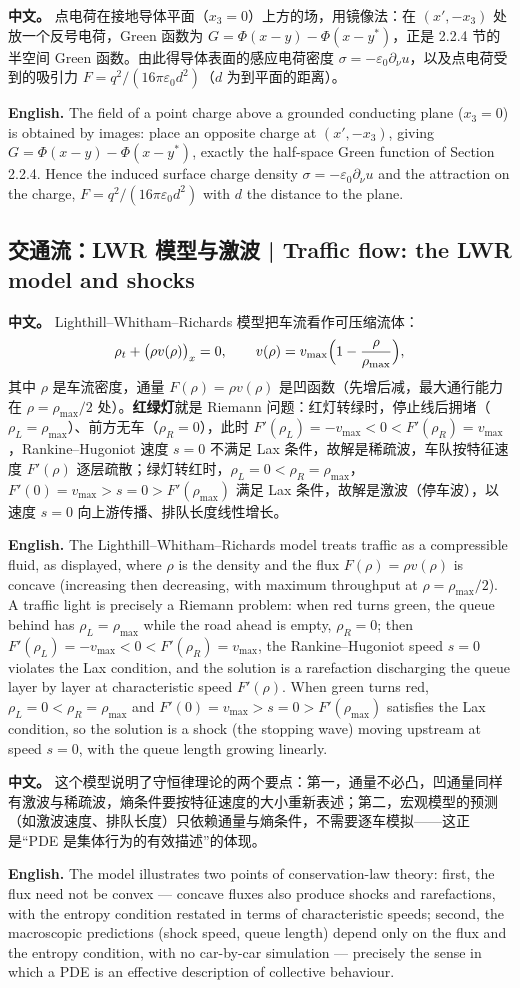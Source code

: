 \documentclass[UTF8,11pt,a4paper]{ctexart}
\newcommand{\APS}[2]{\par\noindent\textbf{中文。} #1\par\noindent\textbf{English.} #2\par\smallskip}
\begin{document}
\APS{点电荷在接地导体平面（$x_3=0$）上方的场，用镜像法：在 $(x',-x_3)$ 处放一个反号电荷，Green 函数为 $G=\Phi(x-y)-\Phi(x-y^*)$，正是 2.2.4 节的半空间 Green 函数。由此得导体表面的感应电荷密度 $\sigma=-\varepsilon_0\partial_\nu u$，以及点电荷受到的吸引力 $F=q^2/(16\pi\varepsilon_0d^2)$（$d$ 为到平面的距离）。}{The field of a point charge above a grounded conducting plane ($x_3=0$) is obtained by images: place an opposite charge at $(x',-x_3)$, giving $G=\Phi(x-y)-\Phi(x-y^*)$, exactly the half-space Green function of Section 2.2.4. Hence the induced surface charge density $\sigma=-\varepsilon_0\partial_\nu u$ and the attraction on the charge, $F=q^2/(16\pi\varepsilon_0d^2)$ with $d$ the distance to the plane.}

\subsection{交通流：LWR 模型与激波 | Traffic flow: the LWR model and shocks}
\APS{Lighthill--Whitham--Richards 模型把车流看作可压缩流体：
\[
\rho_t+\bigl(\rho v(\rho)\bigr)_x=0,\qquad v(\rho)=v_{\max}\Bigl(1-\frac{\rho}{\rho_{\max}}\Bigr),
\]
其中 $\rho$ 是车流密度，通量 $F(\rho)=\rho v(\rho)$ 是凹函数（先增后减，最大通行能力在 $\rho=\rho_{\max}/2$ 处）。\textbf{红绿灯}就是 Riemann 问题：红灯转绿时，停止线后拥堵（$\rho_L=\rho_{\max}$）、前方无车（$\rho_R=0$），此时 $F'(\rho_L)=-v_{\max}<0<F'(\rho_R)=v_{\max}$，Rankine--Hugoniot 速度 $s=0$ 不满足 Lax 条件，故解是稀疏波，车队按特征速度 $F'(\rho)$ 逐层疏散；绿灯转红时，$\rho_L=0<\rho_R=\rho_{\max}$，$F'(0)=v_{\max}>s=0>F'(\rho_{\max})$ 满足 Lax 条件，故解是激波（停车波），以速度 $s=0$ 向上游传播、排队长度线性增长。}{The Lighthill--Whitham--Richards model treats traffic as a compressible fluid, as displayed, where $\rho$ is the density and the flux $F(\rho)=\rho v(\rho)$ is concave (increasing then decreasing, with maximum throughput at $\rho=\rho_{\max}/2$). A traffic light is precisely a Riemann problem: when red turns green, the queue behind has $\rho_L=\rho_{\max}$ while the road ahead is empty, $\rho_R=0$; then $F'(\rho_L)=-v_{\max}<0<F'(\rho_R)=v_{\max}$, the Rankine--Hugoniot speed $s=0$ violates the Lax condition, and the solution is a rarefaction discharging the queue layer by layer at characteristic speed $F'(\rho)$. When green turns red, $\rho_L=0<\rho_R=\rho_{\max}$ and $F'(0)=v_{\max}>s=0>F'(\rho_{\max})$ satisfies the Lax condition, so the solution is a shock (the stopping wave) moving upstream at speed $s=0$, with the queue length growing linearly.}

\APS{这个模型说明了守恒律理论的两个要点：第一，通量不必凸，凹通量同样有激波与稀疏波，熵条件要按特征速度的大小重新表述；第二，宏观模型的预测（如激波速度、排队长度）只依赖通量与熵条件，不需要逐车模拟——这正是``PDE 是集体行为的有效描述''的体现。}{The model illustrates two points of conservation-law theory: first, the flux need not be convex — concave fluxes also produce shocks and rarefactions, with the entropy condition restated in terms of characteristic speeds; second, the macroscopic predictions (shock speed, queue length) depend only on the flux and the entropy condition, with no car-by-car simulation — precisely the sense in which a PDE is an effective description of collective behaviour.}
\end{document}
